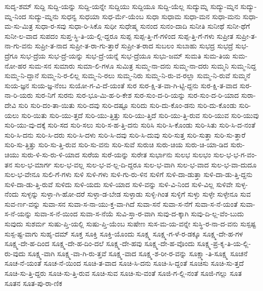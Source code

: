 {ಸುದೃ-ಶಮ್
ಸುದ್ದಿ
ಸುದ್ದಿ-ಯನ್ನು
ಸುದ್ದಿ-ಯನ್ನೇ
ಸುದ್ದಿಯು
ಸುದ್ದಿಯೂ
ಸುದ್ದಿ-ಯೆಲ್ಲ
ಸುದ್ಯುಮ್ನ
ಸುದ್ಯು-ಮ್ನನ
ಸುದ್ಯು-ಮ್ನ-ನಿಂದ
ಸುದ್ಯು-ಮ್ನನು
ಸುಧನ್ವ
ಸುಧಯಾ
ಸುಧ-ರ್ಮೆ-ಯೆಂಬ
ಸುಧಾ
ಸುಧಾಮ
ಸುಧಾ-ಮನ
ಸುಧಾ-ಮನು
ಸುಧಾ-ಮ-ಸು-ಮಿತ್ರ
ಸುಧಾ-ರ-ಸವು
ಸುಧಾ-ರಿ-ಸಿಕೊ
ಸುಧೀ
ಸುಧೇಷ್ಮ
ಸುನಂದ
ಸುನಂ-ದಾದಿ
ಸುನೀತಿ
ಸುನೀಥೆ
ಸುನೀ-ಥೆಗೆ
ಸುನೀ-ಲ-ವಾದ
ಸುಪದಂ
ಸುಪ್ತ-ಸ್ಥಿ-ತಿ-ಯ-ಲ್ಲಿ-ದ್ದರೂ
ಸುಪ್ಪ
ಸುಪ್ಪ-ತ್ತಿ-ಗೆ-ಗಳಿಂದ
ಸುಪ್ಪ-ತ್ತಿ-ಗೆ-ಗಳು
ಸುಪ್ರೀತ
ಸುಪ್ರೀ-ತ-ನಾ-ಗು-ವನು
ಸುಪ್ರೀ-ತ-ನಾದ
ಸುಪ್ರೀ-ತ-ರಾ-ಗು-ತ್ತಾರೆ
ಸುಪ್ರೀ-ತ-ರಾದ
ಸುಬಲಂ
ಸುಬಾಹು
ಸುಭದ್ರ
ಸುಭದ್ರೆ
ಸುಭ-ದ್ರೆಗೂ
ಸುಭ-ದ್ರೆಯ
ಸುಭ-ದ್ರೆ-ಯನ್ನು
ಸುಭ-ದ್ರೆ-ಯನ್ನೆ
ಸುಭ-ದ್ರೆಯೂ
ಸುಭು-ಜಮ್
ಸುಮತಿ
ಸುಮ-ತಿಯ
ಸುಮ-ನೋ-ಹರ
ಸುಮ-ಸನ
ಸುಮಾರು
ಸುಮಾ-ಲಿ-ಗಳೂ
ಸುಮಿತ್ರ
ಸುಮ್ಮ-ನಾ-ದನು
ಸುಮ್ಮ-ನಾ-ದರು
ಸುಮ್ಮನಿ
ಸುಮ್ಮ-ನಿದ್ದ
ಸುಮ್ಮ-ನಿ-ದ್ದಾನೆ
ಸುಮ್ಮ-ನಿ-ರ-ಲಿಲ್ಲ
ಸುಮ್ಮ-ನಿ-ರಲು
ಸುಮ್ಮ-ನಿರು
ಸುಮ್ಮ-ನಿ-ರು-ವ-ರಲ್ಲಾ
ಸುಮ್ಮ-ನಿ-ರುವೆ
ಸುಮ್ಮನೆ
ಸುಯ-ಜ್ಞನ
ಸುಯ-ಜ್ಞ-ನೆಂಬ
ಸುಯೋ-ಗ-ವಿ-ದೆ-ಯಂತೆ
ಸುರ
ಸುರ-ಕ್ಷಿ-ತ-ವಾ-ಗಿ-ಟ್ಟಿ-ದ್ದನು
ಸುರ-ಕ್ಷಿ-ತ-ವಾದ
ಸುರ-ನಾ-ರಿ-ಯರು
ಸುರ-ನಿಗೆ
ಸುರನು
ಸುರ-ಭೂ-ಮಿ-ಹ-ರಿ-ಕೇಶ
ಸುರ-ಸುಂ-ದ-ರಿ-ಯನ್ನು
ಸುರ-ಸುಂ-ದ-ರಿ-ಯಾದ
ಸುರಾ-ದೇವಿ
ಸುರಿ
ಸುರಿ-ದಂ-ತಾ-ಯಿತು
ಸುರಿ-ದವು
ಸುರಿ-ದಷ್ಟೂ
ಸುರಿದು
ಸುರಿ-ದು-ಕೊಂ-ಡನು
ಸುರಿ-ದು-ಕೊಂಡು
ಸುರಿ-ಯಲು
ಸುರಿ-ಯಿತು
ಸುರಿ-ಯು-ತ್ತದೆ
ಸುರಿ-ಯು-ತ್ತಿತ್ತು
ಸುರಿ-ಯು-ತ್ತಿದೆ
ಸುರಿ-ಯು-ತ್ತಿ-ರುವ
ಸುರಿ-ಯುವ
ಸುರಿ-ಯುವು
ಸುರಿ-ಯು-ವು-ದಕ್ಕೆ
ಸುರಿ-ಸದ
ಸುರಿ-ಸಲು
ಸುರಿ-ಸ-ಹ-ತ್ತಿ-ದನು
ಸುರಿಸಿ
ಸುರಿ-ಸಿ-ಕೊಂಡು
ಸುರಿ-ಸಿತು
ಸುರಿ-ಸಿ-ದ-ನಂತೆ
ಸುರಿ-ಸಿ-ದನು
ಸುರಿ-ಸಿ-ದರು
ಸುರಿ-ಸಿ-ದಳು
ಸುರಿ-ಸಿ-ದವು
ಸುರಿ-ಸಿ-ದುವು
ಸುರಿ-ಸುತ್ತ
ಸುರಿ-ಸುತ್ತಾ
ಸುರಿ-ಸು-ತ್ತಾರೆ
ಸುರಿ-ಸು-ತ್ತಿತ್ತು
ಸುರಿ-ಸು-ತ್ತಿ-ರುವ
ಸುರಿ-ಸು-ವನು
ಸುರಿ-ಸುವೆ
ಸುರುಚಿ
ಸುರು-ಚಿಯ
ಸುರು-ಚಿ-ಯಾ-ಡಿದ
ಸುರು-ಚಿಯು
ಸುರು-ಳಿ-ಸು-ರು-ಳಿ-ಯಾದ
ಸುರೆಯ
ಸುರೆ-ಯನ್ನು
ಸುರೇತ
ಸುರ್ಭಾನು
ಸುಲಭ
ಸುಲಭಂ
ಸುಲ-ಭ-ಭ-ಗ-ವಂ-ತನ
ಸುಲ-ಭ-ಮಾರ್ಗ
ಸುಲ-ಭ-ವಲ್ಲ
ಸುಲ-ಭ-ವ-ಲ್ಲ-ದಿ-ದ್ದರೂ
ಸುಲ-ಭ-ವಾಗಿ
ಸುಲ-ಭ-ವಾದ
ಸುಲ-ಭ-ವಾ-ದುದೂ
ಸುಲ-ಭ-ವೇನೂ
ಸುಲಿ-ಗೆ-ಗಳು
ಸುಳಿ
ಸುಳಿ-ಗಳು
ಸುಳಿ-ಗು-ರು-ಳಿನ
ಸುಳಿಗೆ
ಸುಳಿ-ದಾ-ಡುತ್ತಾ
ಸುಳಿ-ದಾ-ಡು-ತ್ತಿ-ದ್ದನು
ಸುಳಿ-ದಾ-ಡು-ತ್ತಿ-ರುವೆ
ಸುಳಿದು
ಸುಳಿ-ಯದು
ಸುಳಿ-ಯಾದ
ಸುಳಿ-ವನ್ನು
ಸುಳಿ-ವಿ-ನಿಂದ
ಸುಳಿ-ವಿಲ್ಲ
ಸುಳಿವೇ
ಸುಳ್ಳ-ನೆಂದು
ಸುಳ್ಳನ್ನು
ಸುಳ್ಳಾ-ಗಿ-ಹೋ-ದರೆ
ಸುಳ್ಳಾ-ಡ-ಬೇಡ
ಸುಳ್ಳಾಡು
ಸುಳ್ಳಿ-ಗಿಂತ
ಸುಳ್ಳಿಗೆ
ಸುಳ್ಳು
ಸುಳ್ಳೇ
ಸುಳ್ಳೇನೂ
ಸುವ
ಸುವ-ರ್ಣ-ವನ್ನು
ಸುವಾ-ಸನ
ಸುವಾ-ಸ-ನಾ-ಯು-ಕ್ತ-ವಾ-ಗಿದೆ
ಸುವಾ-ಸನೆ
ಸುವಾ-ಸ-ನೆಗೆ
ಸುವಾ-ಸ-ನೆ-ಯಂತೆ
ಸುವಾ-ಸ-ನೆ-ಯನ್ನು
ಸುವಾ-ಸ-ನೆ-ಯಿಂದ
ಸುವಾ-ಸ-ನೆಯೆ
ಸುವಿ-ಸ್ತಾ-ರ-ವಾಗಿ
ಸುವು-ದ-ಕ್ಕಾಗಿ
ಸುವು-ದಿ-ಲ್ಲ-ವೆಂ-ಬುದು
ಸುವುದು
ಸುಶರ್ಮ
ಸುಷು-ಪ್ತಿ-ಯಲ್ಲಿ
ಸುಷು-ಪ್ತಿ-ಯೆಂಬ
ಸುಷೇಣ
ಸುಸ-ಮ-ಯ-ವನ್ನೇ
ಸುಸ್ಥಿ-ರ-ನಾ-ದ-ವನು
ಸುಸ್ಪಷ್ಟ
ಸುಸ್ಪ-ಷ್ಟ-ವಾಗು
ಸುಹೃ-ದಮ್
ಸೂಕ್ತ
ಸೂಕ್ತಿ
ಸೂಕ್ತಿ-ಯೊಂದು
ಸೂಕ್ಷ್ಮ
ಸೂಕ್ಷ್ಮ-ಗ-ಳೆ-ರ-ಡಕ್ಕೂ
ಸೂಕ್ಷ್ಮ-ದೇ-ಹ-ಗಳ
ಸೂಕ್ಷ್ಮ-ದೇ-ಹ-ದಿಂದ
ಸೂಕ್ಷ್ಮ-ದೇ-ಹ-ದಿಂ-ದಲೆ
ಸೂಕ್ಷ್ಮ-ದೇ-ಹವು
ಸೂಕ್ಷ್ಮ-ದೇ-ಹ-ವೊಂದು
ಸೂಕ್ಷ್ಮ-ಪ್ರ-ಕೃ-ತಿ-ಯ-ಲ್ಲಿ-ರು-ವುದು
ಸೂಕ್ಷ್ಮ-ವಾಗಿ
ಸೂಕ್ಷ್ಮ-ವಾ-ಗಿ-ರು-ತ್ತವೆ
ಸೂಕ್ಷ್ಮ-ವಾದ
ಸೂಕ್ಷ್ಮ-ಶ-ರೀ-ರ-ವನ್ನು
ಸೂಕ್ಷ್ಮಾ-ತಿ-ಸೂಕ್ಷ್ಮ
ಸೂಚನೆ
ಸೂಚ-ನೆ-ಯಂತೆ
ಸೂಚ-ನೆ-ಯಿಂದ
ಸೂಚಿ-ತ-ವಾದ
ಸೂಚಿ-ಸಿ-ದನು
ಸೂಚಿ-ಸಿ-ದ್ದಂತೆ
ಸೂಚಿಸು
ಸೂಚಿ-ಸು-ತ್ತದೆ
ಸೂಚಿ-ಸು-ತ್ತಿ-ದ್ದರು
ಸೂಚಿ-ಸು-ತ್ತಿ-ರುವ
ಸೂಚಿ-ಸುವ
ಸೂಚಿ-ಸು-ವಂತೆ
ಸೂಜಿ-ಗ-ಲ್ಲಿ-ನಂತೆ
ಸೂಜಿ-ಗಲ್ಲು
ಸೂತ
ಸೂತನ
ಸೂತ-ಪು-ರಾ-ಣಿಕ
}
